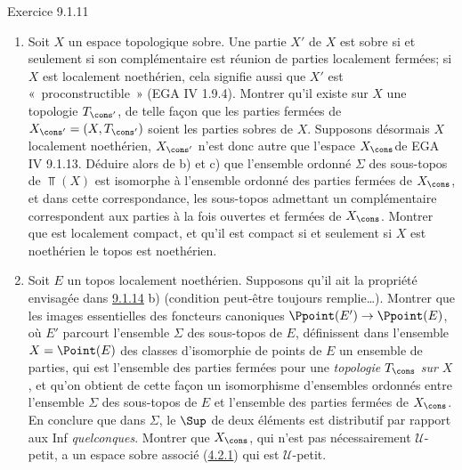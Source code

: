 \documentclass[10pt]{../fichiers-configuration-latex/smfart}
\begin{document}
\begin{enonce*}[remark]{Exercice 9.1.11}
\begin{enumerate}
\item Soit $X$ un espace topologique sobre. Une partie $X'$ de $X$ est
sobre si et seulement si son complémentaire est réunion de parties
localement fermées; si $X$ est localement noethérien, cela signifie
aussi que $X'$ est « proconstructible »  (EGA IV 1.9.4). Montrer
qu'il existe sur $X$ une topologie $T_{\cons'}$, de telle façon
que les parties fermées de $X_{\cons'}=(X,T_{\cons'})$ soient les
parties sobres de $X$. Supposons désormais $X$ localement
noethérien, $X_{\cons'}$ n'est donc autre que l'espace
$X_{\cons}$\pageoriginale de EGA IV 9.1.13. Déduire alors de b) et c)
que l'ensemble ordonné $\Sigma$ des sous-topos de $\Top(X)$ est
isomorphe à l'ensemble ordonné des parties fermées de $X_{\cons}$,
et dans cette correspondance, les sous-topos admettant un
complémentaire correspondent aux parties à la fois ouvertes et
fermées de $X_{\cons}$. Montrer que  est localement compact, et
qu'il est compact si et seulement si $X$ est noethérien \ie le topos
 est noethérien.

\item Soit $E$ un topos localement noethérien. Supposons qu'il ait la
propriété envisagée dans \hyperref[IV.subsubsec9.1.14]{9.1.14} b) (condition
peut-être toujours remplie\ldots). Montrer que les images
essentielles des foncteurs canoniques $\Ppoint(E')\rightarrow
\Ppoint(E)$, où $E'$ parcourt l'ensemble $\Sigma$ des sous-topos de
$E$, définissent dans l'ensemble $X=\Point(E)$ des classes
d'isomorphie de points de $E$ un ensemble de parties, qui est
l'ensemble des parties fermées pour une \emph{topologie} $T_{\cons}$
\emph{sur} $X$, et qu'on obtient de cette façon un isomorphisme
d'ensembles ordonnés entre l'ensemble $\Sigma$ des sous-topos de $E$
et l'ensemble des parties fermées de $X_{\cons}$. En conclure que
dans $\Sigma$, le $\Sup$ de deux éléments est distributif par
rapport aux Inf \emph{quelconques}. Montrer que $X_{\cons}$, qui
n'est pas nécessairement $𝒰$-petit, a un espace sobre
associé (\hyperref[IV.subsubsec4.2.1]{4.2.1}) qui est $𝒰$-petit.
\end{enumerate}
\end{enonce*}
\end{document}
